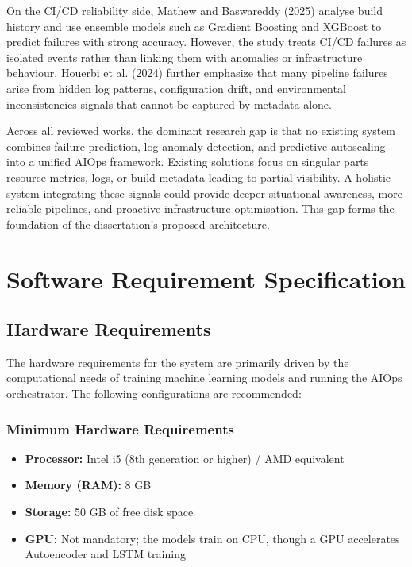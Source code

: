 \documentclass[12pt]{report}
\begin{document}
On the CI/CD reliability side, Mathew and Baswareddy (2025) analyse build history and use ensemble models such as Gradient Boosting and XGBoost to predict failures with strong accuracy. However, the study treats CI/CD failures as isolated events rather than linking them with anomalies or infrastructure behaviour. Houerbi et al. (2024) further emphasize that many pipeline failures arise from hidden log patterns, configuration drift, and environmental inconsistencies signals that cannot be captured by metadata alone.

Across all reviewed works, the dominant research gap is that no existing system combines failure prediction, log anomaly detection, and predictive autoscaling into a unified AIOps framework. Existing solutions focus on singular parts resource metrics, logs, or build metadata leading to partial visibility. A holistic system integrating these signals could provide deeper situational awareness, more reliable pipelines, and proactive infrastructure optimisation. This gap forms the foundation of the dissertation's proposed architecture.

\clearpage
\chapter{Software Requirement Specification}

\section{Hardware Requirements}

The hardware requirements for the system are primarily driven by the computational needs of training machine learning models and running the AIOps orchestrator. The following configurations are recommended:

\subsection*{Minimum Hardware Requirements}
\begin{itemize}
    \item \textbf{Processor:} Intel i5 (8th generation or higher) / AMD equivalent
    \item \textbf{Memory (RAM):} 8 GB
    \item \textbf{Storage:} 50 GB of free disk space
    \item \textbf{GPU:} Not mandatory; the models train on CPU, though a GPU accelerates Autoencoder and LSTM training
\end{itemize}
\end{document}
